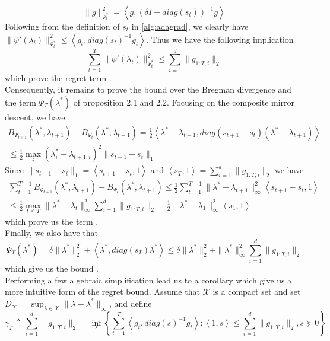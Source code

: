 \documentclass[notitlepage]{article}
\newcommand*\circled[1]{\tikz[baseline=(char.base)]{\node[shape=circle,draw,inner sep=2pt] (char) {#1};}}
\begin{document}
\[ \| g \|_{\Psi_t^*}^2 = \left\langle g,(\delta I + diag(s_t))^{-1} g \right\rangle\]
Following from the definition of $s_t$ in \ref{alg:adagrad}, we clearly have $\|\psi'(\lambda_t)\|_{\Psi_t^*}^2 \le \left\langle g_t, diag(s_t)^{-1} g_t \right\rangle$. Thus we have the following implication
\[ \sum_{t=1}^T \|\psi'(\lambda_t)\|_{\Psi_t^*}^2 \le \sum_{i=1}^d \|g_{1:T,i}\|_2 \]
which prove the regret term \circled{2}.\\
Consequently, it remains to prove the bound over the Bregman divergence and the term $\Psi_T(\lambda^*)$ of proposition 2.1 and 2.2. Focusing on the composite mirror descent, we have:
\begin{align*}
  B_{\Psi_{t+1}} (\lambda^*, \lambda_{t+1}) - B_{\Psi_{t}} (\lambda^*, \lambda_{t+1}) = \frac{1}{2} \left\langle \lambda^* - \lambda_{t+1}, diag(s_{t+1} - s_t)(\lambda^* - \lambda_{t+1}) \right\rangle \\
  \le \frac{1}{2} \max_i (\lambda_i^* - \lambda_{t+1,i})^2 \| s_{t+1} - s_t \|_1
\end{align*}
Since $\| s_{t+1} - s_t \|_1 = \left\langle s_{t+1} - s_t, 1 \right\rangle$ and $\left\langle s_T,1 \right\rangle = \sum_{i=1}^d \| g_{1:T,i} \|_2$ we have
\begin{align*}
  \sum_{t=1}^{T-1} B_{\Psi_{t+1}} (\lambda^*, \lambda_{t+1}) - B_{\Psi_{t}} (\lambda^*, \lambda_{t+1}) \le \frac{1}{2} \sum_{t=1}^{T-1} \| \lambda^* - \lambda_{t+1} \|_\infty^2 \left\langle s_{t+1} - s_t, 1 \right\rangle \\
  \le \frac{1}{2} \max_{t \le T} \|\lambda^* - \lambda_t\|_\infty^2 \sum_{i=1}^d \|g_{1:T,i}\|_2 - \frac{1}{2} \|\lambda^* - \lambda_1\|_\infty^2 \left\langle s_1,1 \right\rangle
\end{align*} 
which prove us the term \circled{3}.\\
Finally, we also have that
\[ \Psi_T(\lambda^*) = \delta \|\lambda^*\|_2^2 + \left\langle \lambda^*, diag(s_T) \lambda^* \right\rangle \le \delta \|\lambda^*\|_2^2 + \|\lambda^*\|_\infty^2 \sum_{i=1}^d \|g_{1:T,i}\|_2 \]
which give us the bound \circled{1}.\\
Performing a few algebraic simplification lead us to a corollary which give us a more intuitive form of the regret bound. Assume that $\mathcal{X}$ is a compact set and set $D_\infty = \sup_{\lambda \in \mathcal{X}} \| \lambda - \lambda^* \|_\infty$, and define
\[ \gamma_T \triangleq \sum_{i=1}^d \| g_{1:T,i} \|_2 = \inf_s \left\lbrace \sum_{t=1}^T \left\langle g_t,diag(s)^{-1} g_t \right\rangle : \left\langle 1,s \right\rangle \le \sum_{i=1}^d \| g_{1:T,i} \|_2, s \succeq 0 \right\rbrace \]
\end{document}
